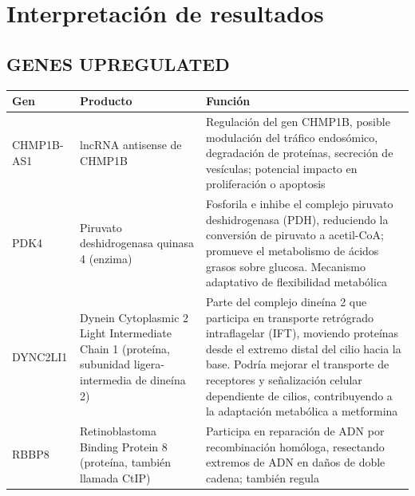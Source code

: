 \documentclass[
  spanish,
  11pt,
]{article}
\begin{document}
\section{Interpretación de
resultados}\label{interpretaciuxf3n-de-resultados}

\subsection{GENES UPREGULATED}\label{genes-upregulated}

\begin{longtable}[]{@{}
  >{\raggedright\arraybackslash}p{}
  >{\raggedright\arraybackslash}p{}
  >{\raggedright\arraybackslash}p{}@{}}
\toprule\noalign{}
\begin{minipage}[b]{\linewidth}\raggedright
Gen
\end{minipage} & \begin{minipage}[b]{\linewidth}\raggedright
Producto
\end{minipage} & \begin{minipage}[b]{\linewidth}\raggedright
Función
\end{minipage} \\
\midrule\noalign{}
\endhead
\bottomrule\noalign{}
\endlastfoot
CHMP1B-AS1 & lncRNA antisense de CHMP1B & Regulación del gen CHMP1B,
posible modulación del tráfico endosómico, degradación de proteínas,
secreción de vesículas; potencial impacto en proliferación o
apoptosis \\
PDK4 & Piruvato deshidrogenasa quinasa 4 (enzima) & Fosforila e inhibe
el complejo piruvato deshidrogenasa (PDH), reduciendo la conversión de
piruvato a acetil-CoA; promueve el metabolismo de ácidos grasos sobre
glucosa. Mecanismo adaptativo de flexibilidad metabólica \\
DYNC2LI1 & Dynein Cytoplasmic 2 Light Intermediate Chain 1 (proteína,
subunidad ligera-intermedia de dineína 2) & Parte del complejo dineína 2
que participa en transporte retrógrado intraflagelar (IFT), moviendo
proteínas desde el extremo distal del cilio hacia la base. Podría
mejorar el transporte de receptores y señalización celular dependiente
de cilios, contribuyendo a la adaptación metabólica a metformina \\
RBBP8 & Retinoblastoma Binding Protein 8 (proteína, también llamada
CtIP) & Participa en reparación de ADN por recombinación homóloga,
resectando extremos de ADN en daños de doble cadena; también regula

\end{longtable}
\end{document}
